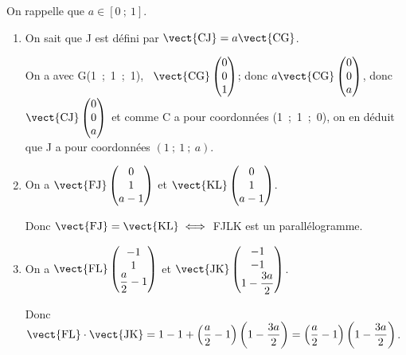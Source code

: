 On rappelle que $a \in [0~;~1]$.

\medskip

\begin{enumerate}
\item 
On sait que J est défini par $\vect{\text{CJ}} = a \vect{\text{CG}}$.

On a avec G(1~;~1~;~1), \, $\vect{\text{CG}}\begin{pmatrix}0\\0\\ 1\end{pmatrix}$; donc $a \vect{\text{CG}}\begin{pmatrix}0\\0\\a\end{pmatrix}$, donc $\vect{\text{CJ}}\begin{pmatrix}0\\0\\a\end{pmatrix}$ et comme C a pour coordonnées (1~;~1~;~0), on en déduit que J a pour coordonnées $(1~;~1~;~a)$.
\item 
On a $\vect{\text{FJ}}\begin{pmatrix}0\\1\\a - 1\end{pmatrix}$ et $\vect{\text{KL}}\begin{pmatrix}0\\1\\a - 1\end{pmatrix}$.

Donc $\vect{\text{FJ}} = \vect{\text{KL}} \iff $ FJLK est un parallélogramme.
\item 
On a $\vect{\text{FL}}\begin{pmatrix}-1\\1\\\dfrac{a}{2} - 1\end{pmatrix}$ et $\vect{\text{JK}}\begin{pmatrix}- 1\\-1\\1 - \dfrac{3a}{2} \end{pmatrix}$.

Donc $\vect{\text{FL}} \cdot \vect{\text{JK}} = 1 - 1 + 
\left(\dfrac{a}{2} - 1 \right)\left(1 - \dfrac{3a}{2} \right) = \left(\dfrac{a}{2} - 1 \right)\left(1 - \dfrac{3a}{2} \right)$.


\end{enumerate}
